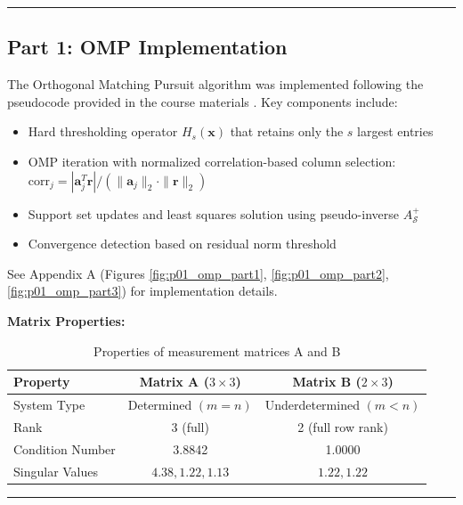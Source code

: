 \vspace{1em}

\noindent\rule{\textwidth}{0.4pt}

\clearpage
\subsection*{Part 1: OMP Implementation}

The Orthogonal Matching Pursuit algorithm was implemented following the pseudocode provided in the course materials \cite{panchenko_448_notes}. Key components include:

\begin{itemize}
    \item Hard thresholding operator $H_s(\mathbf{x})$ that retains only the $s$ largest entries
    \item OMP iteration with normalized correlation-based column selection: $\text{corr}_j = |\mathbf{a}_j^T \mathbf{r}| / (\|\mathbf{a}_j\|_2 \cdot \|\mathbf{r}\|_2)$
    \item Support set updates and least squares solution using pseudo-inverse $A_\mathcal{S}^+$
    \item Convergence detection based on residual norm threshold
\end{itemize}

See Appendix A (Figures \ref{fig:p01_omp_part1}, \ref{fig:p01_omp_part2}, \ref{fig:p01_omp_part3}) for implementation details.

\vspace{1em}

\textbf{Matrix Properties:}

\begin{table}[h]
\centering
\begin{tabular}{lcc}
\toprule
Property & Matrix A ($3 \times 3$) & Matrix B ($2 \times 3$) \\
\midrule
System Type & Determined $(m=n)$ & Underdetermined $(m<n)$ \\
Rank & 3 (full) & 2 (full row rank) \\
Condition Number & 3.8842 & 1.0000 \\
Singular Values & $4.38, 1.22, 1.13$ & $1.22, 1.22$ \\
\bottomrule
\end{tabular}
\caption{Properties of measurement matrices A and B}
\end{table}

\vspace{2em}
\noindent\rule{\textwidth}{0.4pt}

